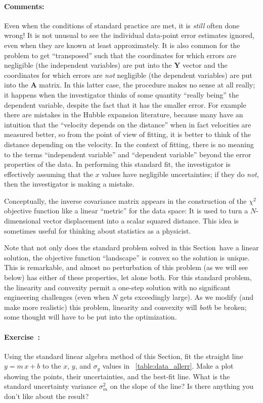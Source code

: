 \documentclass[12pt]{article}
\newcommand{\sectionname}{Section}
\newcommand{\problemname}{Exercise}
\newcommand{\commentsname}{Comments}
\newcounter{problem}
\newenvironment{problem}{\paragraph{\problemname~\theproblem:}\refstepcounter{problem}}{}
\newenvironment{comments}{\paragraph{\commentsname:}}{}
\newcommand{\mmatrix}[1]{\boldsymbol{#1}}
\newcommand{\mA}{\mmatrix{A}}
\newcommand{\mY}{\mmatrix{Y}}
\begin{document}
\begin{comments}
Even when the conditions of standard practice are met, it is
\emph{still} often done wrong!  It is not unusual to see the
individual data-point error estimates ignored, even when they are
known at least approximately.  It is also common for the problem to
get ``transposed'' such that the coordinates for which errors are
negligible (the independent variables) are put into the $\mY$ vector
and the coordinates for which errors are \emph{not} negligible (the
dependent variables) are put into the $\mA$ matrix.  In this latter
case, the procedure makes no sense at all really; it happens when the
investigator thinks of some quantity ``really being'' the dependent
variable, despite the fact that it has the smaller error.  For example
there are mistakes in the Hubble expansion literature, because many
have an intuition that the ``velocity depends on the distance'' when
in fact velocities are measured better, so from the point of view of
fitting, it is better to think of the distance depending on the
velocity.  In the context of fitting, there is no meaning to the terms
``independent variable'' and ``dependent variable'' beyond the error
properties of the data.  In performing this standard fit, the
investigator is effectively assuming that the $x$ values have
negligible uncertainties; if they do \emph{not}, then the investigator
is making a mistake.

Conceptually, the inverse covariance matrix appears in the
construction of the $\chi^2$ objective function like a linear
``metric'' for the data space: It is used to turn a $N$-dimensional
vector displacement into a scalar squared distance.  This idea is
sometimes useful for thinking about statistics as a physicist.

Note that not only does the standard problem solved in this
\sectionname\ have a linear solution, the objective function
``landscape'' is convex so the solution is unique.  This is
remarkable, and almost no perturbation of this problem (as we will see
below) has either of these properties, let alone both.  For this
standard problem, the linearity and convexity permit a one-step
solution with no significant engineering challenges (even when $N$
gets exceedingly large).  As we modify (and make more realistic) this
problem, linearity and convexity will \emph{both} be broken; some
thought will have to be put into the optimization.
\end{comments}

\begin{problem}\label{prob:standard}
Using the standard linear algebra method of this \sectionname, fit the
straight line $y=m\,x+b$ to the $x$, $y$, and $\sigma_y$ values in
\tablename~\ref{table:data_allerr}.  Make a plot showing the points,
their uncertainties, and the best-fit line.  What is the standard
uncertainty variance $\sigma_m^2$ on the slope of the line?  Is there
anything you don't like about the result?
\end{problem}
\end{document}
